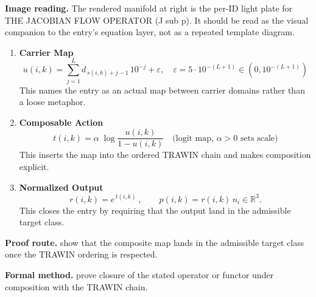 \begin{samepage}
\noindent\begin{minipage}[t]{0.45\linewidth}
\vspace{0pt}
\raggedright
\scriptsize\textbf{Image reading.} The rendered manifold at right is the per-ID light plate for THE JACOBIAN FLOW OPERATOR (J sub p). It should be read as the visual companion to the entry's equation layer, not as a repeated template diagram.\par
\end{minipage}\hfill
\begin{minipage}[t]{0.53\linewidth}
\vspace*{-0.10in}
\raggedright
{}
\end{minipage}
\end{samepage}

\clearpage


\begin{enumerate}[leftmargin=1.6em,itemsep=9pt,topsep=6pt]
\item \textbf{Carrier Map}
\[
u(i,k)=\sum_{j=1}^{L} d_{\,s(i,k)+j-1}\,10^{-j}+\varepsilon,\quad \varepsilon=5\cdot10^{-(L+1)}\in(0,10^{-(L+1)})
\]
This names the entry as an actual map between carrier domains rather than a loose metaphor.

\item \textbf{Composable Action}
\[
t(i,k)=\alpha\;\log\!\frac{u(i,k)}{1-u(i,k)}\quad\text{(logit map, \(\alpha>0\) sets scale)}
\]
This inserts the map into the ordered TRAWIN chain and makes composition explicit.

\item \textbf{Normalized Output}
\[
r(i,k)=e^{\,t(i,k)}\ ,\qquad p(i,k)=r(i,k)\,n_i\in\mathbb{R}^3.
\]
This closes the entry by requiring that the output land in the admissible target class.
\end{enumerate}

\textbf{Proof route.} show that the composite map lands in the admissible target class once the TRAWIN ordering is respected.

\textbf{Formal method.} prove closure of the stated operator or functor under composition with the TRAWIN chain.

\medskip
{}

